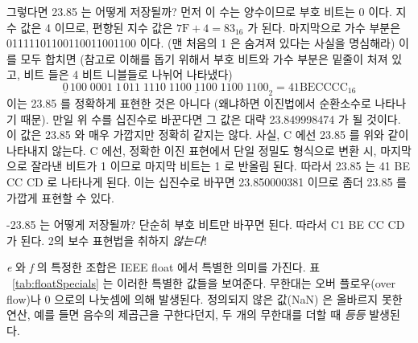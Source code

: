 그렇다면 23.85 는 어떻게 저장될까? 
먼저 이 수는 양수이므로 부호 비트는 0 이다. 지수 값은 4 이므로, 편향된 지수 값은
$7\mathrm{F} + 4 = 83_{16}$ 가 된다. 마지막으로 가수 부분은 01111101100110011001100 이다.
(맨 처음의 1 은 숨겨져 있다는 사실을 명심해라) 이를 모두 합치면 (참고로 이해를 돕기 위해서
부호 비트와 가수 부분은 밑줄이 처져 있고, 비트 들은 4 비트 니블들로 나뉘어 나타냈다)
\[ \underline{0}\,100\;0001\;1
   \,\underline{011\;1110\;1100\;1100\;1100\;1100}_2 = 41 \mathrm{BE} 
\mathrm{CC} \mathrm{CC}_{16} \]
이는 23.85 를 정확하게 표현한 것은 아니다 (왜냐하면 이진법에서 순환소수로 나타나기 때문).
만일 위 수를 십진수로 바꾼다면 그 값은 대략 23.849998474 가 될 것이다. 이 값은
23.85 와 매우 가깝지만 정확히 같지는 않다. 사실, C 에선 23.85 를 위와 같이 나타내지 않는다.
C 에선, 정확한 이진 표현에서 단일 정밀도 형식으로 변환 시, 마지막으로 잘라낸 비트가 1 이므로 마지막 비트는 1 로 반올림 된다. 
따라서 23.85 는 41 BE CC CD 로 나타나게 된다. 이는 십진수로 바꾸면 23.850000381 이므로 좀더
23.85 를 가깝게 표현할 수 있다.  

-23.85 는 어떻게 저장될까? 단순히 부호 비트만 바꾸면 된다. 따라서 C1 BE CC CD 가 된다. 
2의 보수 표현법을 취하지 \emph{않는다}!

\begin{table}[t]
\caption{\emph{f} 와 \emph{e} 의 특별한 값들\label{tab:floatSpecials}}
\end{table}

\emph{e} 와 \emph{f} 의 특정한 조합은 IEEE float 에서 특별한 의미를 가진다.
표 ~\ref{tab:floatSpecials} 는 이러한 특별한 값들을 보여준다. 무한대는 오버 플로우(over flow)나
0 으로의 나눗셈에 의해 발생된다. 정의되지 않은 값(NaN) 은 올바르지 못한 연산, 예를 들면
음수의 제곱근을 구한다던지, 두 개의 무한대를 더할 때 \emph{등등} 발생된다.

